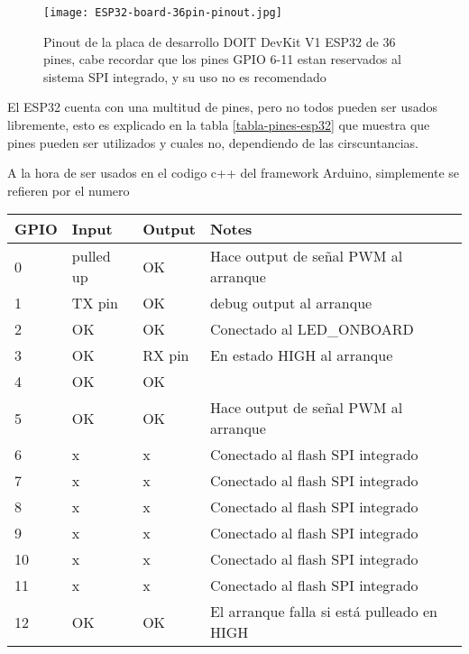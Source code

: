 \documentclass[../informe_krapp.tex]{subfiles}
\begin{document}
\begin{figure}[H]
	\texttt{[image: ESP32-board-36pin-pinout.jpg]}
	\centering
	\caption{Pinout de la placa de desarrollo DOIT DevKit V1 ESP32 de 36 pines,
		cabe recordar que los pines GPIO 6-11 estan reservados al sistema SPI integrado, y su
		uso no es recomendado}
\end{figure}
El ESP32 cuenta con una multitud de pines, pero no todos pueden ser usados libremente,
esto es explicado en la tabla \ref{tabla-pines-esp32} que muestra que pines pueden ser utilizados y cuales no,
dependiendo de las cirscuntancias.

A la hora de ser usados en el codigo c++ del framework Arduino, simplemente se refieren
por el numero

\begin{table}[!ht]
	\centering
	\begin{tabular}{|l|l|l|l|}
		\hline
		GPIO & Input     & Output & Notes                                      \\ \hline
		0    & pulled up & OK     & Hace output de señal PWM al arranque       \\ \hline
		1    & TX pin    & OK     & debug output al arranque                   \\ \hline
		2    & OK        & OK     & Conectado al LED\_ONBOARD                  \\ \hline
		3    & OK        & RX pin & En estado HIGH al arranque                 \\ \hline
		4    & OK        & OK     & ~                                          \\ \hline
		5    & OK        & OK     & Hace output de señal PWM al arranque       \\ \hline
		6    & x         & x      & Conectado al flash SPI integrado           \\ \hline
		7    & x         & x      & Conectado al flash SPI integrado           \\ \hline
		8    & x         & x      & Conectado al flash SPI integrado           \\ \hline
		9    & x         & x      & Conectado al flash SPI integrado           \\ \hline
		10   & x         & x      & Conectado al flash SPI integrado           \\ \hline
		11   & x         & x      & Conectado al flash SPI integrado           \\ \hline
		12   & OK        & OK     & El arranque falla si está pulleado en HIGH \\ \hline

\end{tabular}
\end{table}
\end{document}
